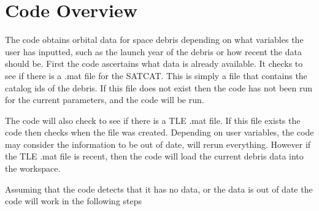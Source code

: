 \documentclass[12pt]{report}
\begin{document}
	\section{Code Overview}
	The code obtains orbital data for space debris depending on what variables the user has inputted, such as the launch year of the debris or how recent the data should be.
	First the code ascertains what data is already available. It checks to see if there is a .mat file for the SATCAT. This is simply a file that contains the catalog ids of the debris. If this file does not exist then the code has not been run for the current parameters, and the code will be run. \par 
	The code will also check to see if there is a TLE .mat file. If this file exists the code then checks when the file was created. Depending on user variables, the code may consider the information to be out of date, will rerun everything. However if the TLE .mat file is recent, then the code will load the current debris data into the workspace.\par 
	Assuming that the code detects that it has no data, or the data is out of date the code will work in the following steps\par 
\end{document}
